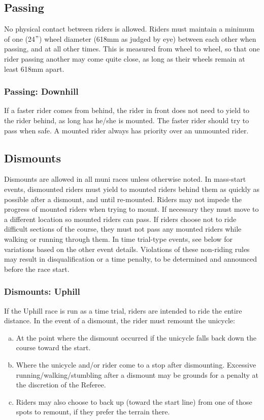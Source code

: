 \subsection{Passing}

No physical contact between riders is allowed.
Riders must maintain a minimum of one (24$"$) wheel diameter (618mm as judged by eye) between each other when passing, and at all other times.
This is measured from wheel to wheel, so that one rider passing another may come quite close, as long as their wheels remain at least 618mm apart.

\subsubsection{Passing: Downhill}

If a faster rider comes from behind, the rider in front does not need to yield to the rider behind, as long has he/she is mounted.
The faster rider should try to pass when safe. A mounted rider always has priority over an unmounted rider.

\subsection{Dismounts}
Dismounts are allowed in all muni races unless otherwise noted.
In mass-start events, dismounted riders must yield to mounted riders behind them as quickly as possible after a dismount, and until re-mounted.
Riders may not impede the progress of mounted riders when trying to mount.
If necessary they must move to a different location so mounted riders can pass.
If riders choose not to ride difficult sections of the course, they must not pass any mounted riders while walking or running through them.
In time trial-type events, see below for variations based on the other event details.
Violations of these non-riding rules may result in disqualification or a time penalty, to be determined and announced before the race start.

\subsubsection{Dismounts: Uphill}
If the Uphill race is run as a time trial, riders are intended to ride the entire distance.
In the event of a dismount, the rider must remount the unicycle:
\begin{enumerate}[(a)]
\item At the point where the dismount occurred if the unicycle falls back down the course toward the start.
\item Where the unicycle and/or rider come to a stop after dismounting.
Excessive running/walking/stumbling after a dismount may be grounds for a
penalty at the discretion of the Referee.
\item Riders may also choose to back up (toward the start line) from one of those spots to remount, if they prefer the terrain there.
\end{enumerate}

